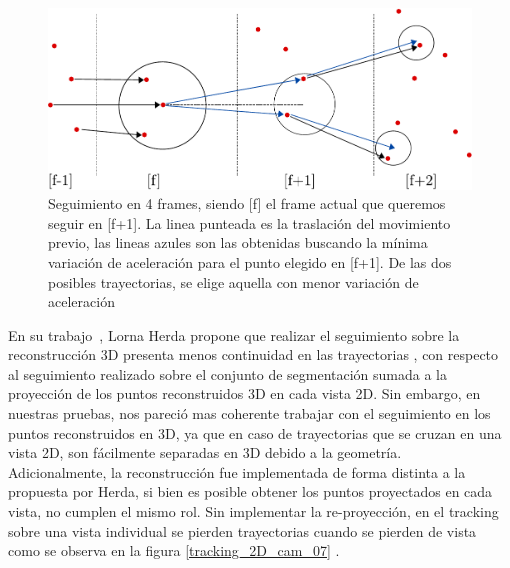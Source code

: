 \begin{figure}[hbt]
\begin{center}
\includegraphics[scale=0.8]{img/Tracking/tracking-eps-converted-to.pdf}
\end{center}
\caption{Seguimiento en 4 frames, siendo [f] el frame actual que queremos seguir en [f+1]. La linea punteada es la traslación del movimiento previo, las lineas azules son las obtenidas buscando la mínima variación de aceleración para el punto elegido en [f+1]. De las dos posibles trayectorias, se elige aquella con menor variación de aceleración}
\label{herda_00}
\end{figure}

En su trabajo~\cite{herda}, Lorna Herda propone que realizar el seguimiento sobre la reconstrucción 3D presenta menos continuidad en las trayectorias , con respecto al seguimiento realizado sobre el conjunto de segmentación sumada a la proyección de los puntos reconstruidos 3D en cada vista 2D. Sin embargo, en nuestras pruebas, nos pareció mas coherente trabajar con el seguimiento en los puntos reconstruidos en 3D, ya que en caso de trayectorias que se cruzan en una vista 2D, son fácilmente separadas en 3D debido a la geometría.
\\ 

Adicionalmente, la reconstrucción fue implementada de forma distinta a la propuesta por Herda, si bien es posible obtener los puntos proyectados en cada vista, no cumplen el mismo rol. Sin implementar la re-proyección, en el tracking sobre una vista individual se pierden trayectorias cuando se pierden de vista como se observa en la figura \ref{tracking_2D_cam_07} .

